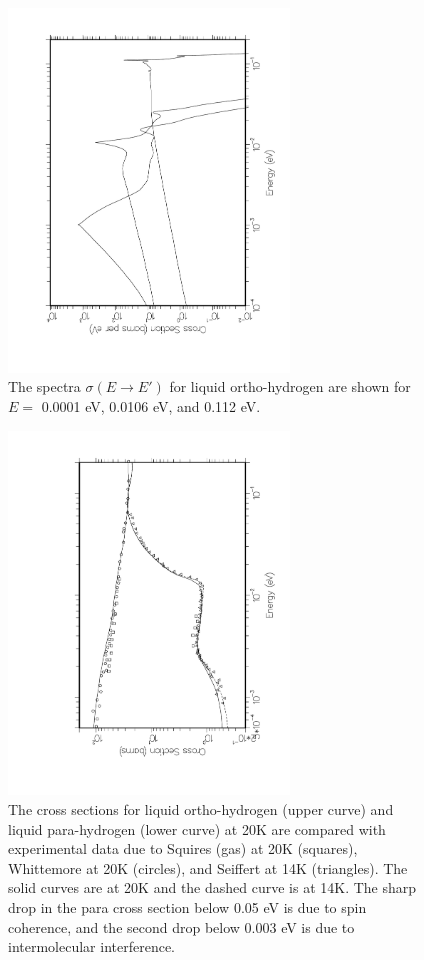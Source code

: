 \begin{figure}[bp]\centering
\includegraphics[keepaspectratio, height=3.8in, angle=270]{figs/le14ack}
\caption[Ortho-hydrogen neutron spectra]{The spectra
 $\sigma(E{\rightarrow}E')$ for liquid ortho-hydrogen are
 shown for $E{=}$ 0.0001 eV, 0.0106 eV, and 0.112 eV.}
\label{fig14}
\end{figure}

\begin{figure}[tp]\centering
\includegraphics[keepaspectratio, height=3.8in, angle=270]{figs/le15ack}
\caption[Liquid hydrogen cross sections]{The cross sections for liquid
 ortho-hydrogen (upper curve) and liquid para-hydrogen (lower curve)
 at 20K are compared with experimental data\cite{data} due to Squires
 (gas) at 20K (squares), Whittemore at 20K (circles),
 and Seiffert at 14K (triangles).  The solid curves
 are at 20K and the dashed curve is at 14K.  The sharp
 drop in the para cross section below 0.05 eV is due
 to spin coherence, and the second drop below 0.003 eV is due to
 intermolecular interference.}
\label{fig15}
\end{figure}


